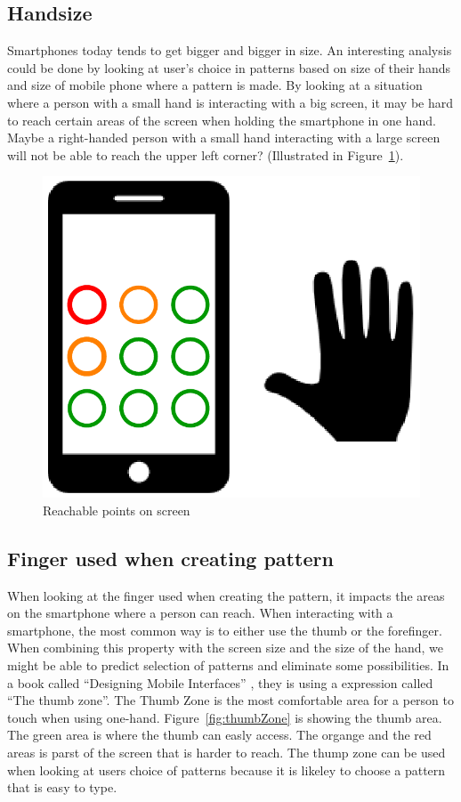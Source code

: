       \subsection*{Handsize}
      Smartphones today tends to get bigger and bigger in size. An interesting analysis could be done by looking at user's choice in patterns based on size of their hands and size of mobile phone where a pattern is made. By looking at a situation where a person with a small hand is interacting with a big screen, it may be hard to reach certain areas of the screen when holding the smartphone in one hand. Maybe a right-handed person with a small hand interacting with a large screen will not be able to reach the upper left corner? (Illustrated in Figure~\ref{fig:reachablePoints}).

        \begin{figure}[H]
          \centering
          \includegraphics[scale=0.22]{pics/review/screenHand.png}
          \caption{Reachable points on screen}
          \label{fig:reachablePoints}
        \end{figure}

      \subsection*{Finger used when creating pattern}
      When looking at the finger used when creating the pattern, it impacts the areas on the smartphone where a person can reach. When interacting with a smartphone, the most common way is to either use the thumb or the forefinger. When combining this property with the screen size and the size of the hand, we might be able to predict selection of patterns and eliminate some possibilities. In a book called ``Designing Mobile Interfaces'' \cite{Hoober}, they is using a expression called ``The thumb zone''. The Thumb Zone is the most comfortable area for a person to touch when using one-hand. Figure~\ref{fig:thumbZone} is showing the thumb area. The green area is where the thumb can easly access. The organge and the red areas is parst of the screen that is harder to reach. The thump zone can be used when looking at users choice of patterns because it is likeley to choose a pattern that is easy to type. 

